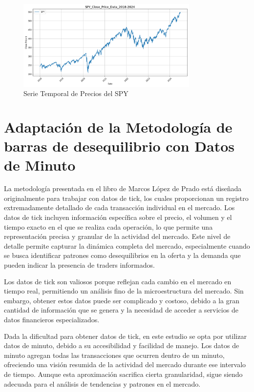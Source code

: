 \documentclass[a4paper,12pt, twoside]{report}
\begin{document}
\begin{figure}[H]
    \centering
    \includegraphics[width=0.8\textwidth]{figures/SPY_Close_Price_Data_2018-2024.png}
    \caption{Serie Temporal de Precios del SPY}
    \label{fig:spy-prices}
\end{figure}
\section{Adaptación de la Metodología de barras de desequilibrio con Datos de Minuto}

La metodología presentada en el libro de Marcos López de Prado está diseñada originalmente para trabajar con datos de tick, 
los cuales proporcionan un registro extremadamente detallado de cada transacción individual en el mercado. Los datos de tick 
incluyen información específica sobre el precio, el volumen y el tiempo exacto en el que se realiza cada operación, lo que 
permite una representación precisa y granular de la actividad del mercado. Este nivel de detalle permite capturar la dinámica 
completa del mercado, especialmente cuando se busca identificar patrones como desequilibrios en la oferta y la demanda que 
pueden indicar la presencia de traders informados.

Los datos de tick son valiosos porque reflejan cada cambio en el mercado en tiempo real, permitiendo un análisis fino de la 
microestructura del mercado. Sin embargo, obtener estos datos puede ser complicado y costoso, debido a la gran cantidad de 
información que se genera y la necesidad de acceder a servicios de datos financieros especializados.

Dada la dificultad para obtener datos de tick, en este estudio se opta por utilizar datos de minuto, debido a su accesibilidad 
y facilidad de manejo. Los datos de minuto agregan todas las transacciones que ocurren dentro de un minuto, ofreciendo una 
visión resumida de la actividad del mercado durante ese intervalo de tiempo. Aunque esta aproximación sacrifica cierta 
granularidad, sigue siendo adecuada para el análisis de tendencias y patrones en el mercado.
\end{document}
